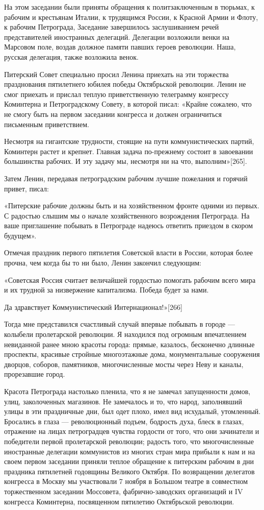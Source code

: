 \documentclass[12pt, a4paper, openany]{book}
\begin{document}
На этом заседании были приняты обращения к политзаключенным в тюрьмах, к рабочим и крестьянам Италии, к трудящимся России, к Красной Армии и Флоту, к рабочим Петрограда, Заседание завершилось заслушиванием речей представителей иностранных делегаций. Делегации возложили венки на Марсовом поле, воздав должное памяти павших героев революции. Наша, русская делегация, также возложила венок.

Питерский Совет специально просил Ленина приехать на эти торжества празднования пятилетнего юбилея победы Октябрьской революции. Ленин не смог приехать и прислал теплую приветственную телеграмму конгрессу Коминтерна и Петроградскому Совету, в которой писал: «Крайне сожалею, что не смогу быть на первом заседании конгресса и должен ограничиться письменным приветствием.

Несмотря на гигантские трудности, стоящие на пути коммунистических партий, Коминтерн растет и крепнет. Главная задача по-прежнему состоит в завоевании большинства рабочих. И эту задачу мы, несмотря ни на что, выполним»[265].

Затем Ленин, передавая петроградским рабочим лучшие пожелания и горячий привет, писал:

«Питерские рабочие должны быть и на хозяйственном фронте одними из первых. С радостью слышим мы о начале хозяйственного возрождения Петрограда. На ваше приглашение побывать в Петрограде надеюсь ответить приездом в скором будущем».

Отмечая праздник первого пятилетия Советской власти в России, которая более прочна, чем когда бы то ни было, Ленин закончил следующим:

«Советская Россия считает величайшей гордостью помогать рабочим всего мира и их трудной за низвержение капитализма. Победа будет за нами.

Да здравствует Коммунистический Интернационал!»[266]

Тогда мне представился счастливый случай впервые побывать в городе — колыбели пролетарской революции. Я находился под огромным впечатлением невиданной ранее мною красоты города: прямые, казалось, бесконечно длинные проспекты, красивые стройные многоэтажные дома, монументальные сооружения дворцов, соборов, памятников, многочисленные мосты через Неву и каналы, прорезавшие город.

Красота Петрограда настолько пленила, что я не замечал запущенности домов, улиц, заколоченных магазинов. Не замечалось и то, что народ, заполнявший улицы в эти праздничные дни, был одет плохо, имел вид исхудалый, утомленный. Бросались в глаза — революционный подъем, бодрость духа, блеск в глазах, отражение на лицах петроградцев чувства гордости от того, что они зачинатели и победители первой пролетарской революции; радость того, что многочисленные иностранные делегации коммунистов из многих стран мира прибыли к нам и на своем первом заседании приняли теплое обращение к питерским рабочим в дни праздника пятилетней годовщины Великого Октября. По возвращении делегатов конгресса в Москву мы участвовали 7 ноября в Большом театре в совместном торжественном заседании Моссовета, фабрично-заводских организаций и IV конгресса Коминтерна, посвященном пятилетию Октябрьской революции.
\end{document}
